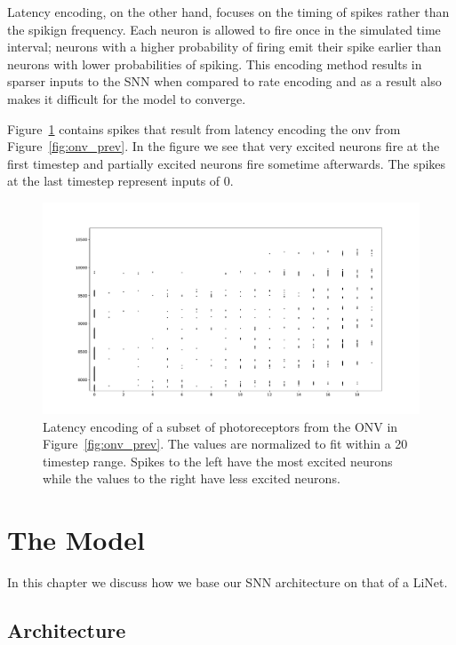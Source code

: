 \documentclass [MS] {UCLAthesis}
\begin{document}
Latency encoding, on the other hand, focuses on the timing of spikes rather than the spikign frequency. Each neuron is allowed to fire once in the simulated time interval; neurons with a higher probability of firing emit their spike earlier than neurons with lower probabilities of spiking. This encoding method results in sparser inputs to the SNN when compared to rate encoding and as a result also makes it difficult for the model to converge.

Figure~\ref{fig:onv_encode_latency} contains spikes that result from latency encoding the onv from Figure~\ref{fig:onv_prev}. In the figure we see that very excited neurons fire at the first timestep and partially excited neurons fire sometime afterwards. The spikes at the last timestep represent inputs of 0.

\begin{figure}
    \centering
    \includegraphics[width=\textwidth]{onv_latency_prev}
    \caption[Latency encoded ONV]{Latency encoding of a subset of photoreceptors from the ONV in Figure~\ref{fig:onv_prev}. The values are normalized to fit within a 20 timestep range. Spikes to the left have the most excited neurons while the values to the right have less excited neurons.}
    \label{fig:onv_encode_latency}
\end{figure}


\chapter{The Model}

In this chapter we discuss how we base our SNN architecture on that of a LiNet.

\section{Architecture}
\end{document}

